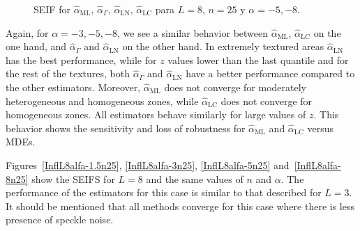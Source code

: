 \documentclass[twocolumn]{svjour3}
\begin{document}
\begin{figure}[hbt]
\centering
{}%
\caption{SEIF for $\widehat{\alpha}_{\text{{ML}}}$, $\widehat{\alpha}_{\Gamma}$, $\widehat{\alpha}_{\text{{LN}}}$, $\widehat{\alpha}_{\text{{LC}}}$ para $L=8$, $n=25$ y $\alpha=-5,-8$.}\label{SEIFL8b} 
\end{figure}

Again, for $\alpha=-3, -5, -8$, we see a similar behavior between $\widehat{\alpha}_{\text{{ML}}}$, $\widehat{\alpha}_{\text{{LC}}}$ on the one hand, and $\widehat{\alpha}_{\Gamma}$ and $\widehat{\alpha}_{\text{{LN}}}$ on the other hand.
In extremely textured areas $\widehat{\alpha}_{\text{{LN}}}$ has the best performance, while for $z$ values lower than the last quantile and for the rest of the textures, both $\widehat{\alpha}_{\Gamma}$ and $\widehat{\alpha}_{\text{{LN}}}$ have a better performance compared to the other estimators. 
Moreover, $\widehat{\alpha}_{\text{{ML}}}$ does not converge for moderately heterogeneous and homogeneous zones, while $\widehat{\alpha}_{\text{{LC}}}$ does not converge for homogeneous zones. All estimators behave similarly for large values of $z$. 
This behavior shows the sensitivity and loss of robustness for $\widehat{\alpha}_{\text{{ML}}}$ and $\widehat{\alpha}_{\text{{LC}}}$ versus MDEs.

Figures~\ref{InflL8alfa-1.5n25}, \ref{InflL8alfa-3n25}, \ref{InflL8alfa-5n25} and~\ref{InflL8alfa-8n25} show the SEIFS for $L=8$ and the same values of $n$ and $\alpha$. 
The performance of the estimators for this case is similar to that described for $L=3$. 
It should be mentioned that all methods converge for this case where there is less presence of speckle noise.
\end{document}
